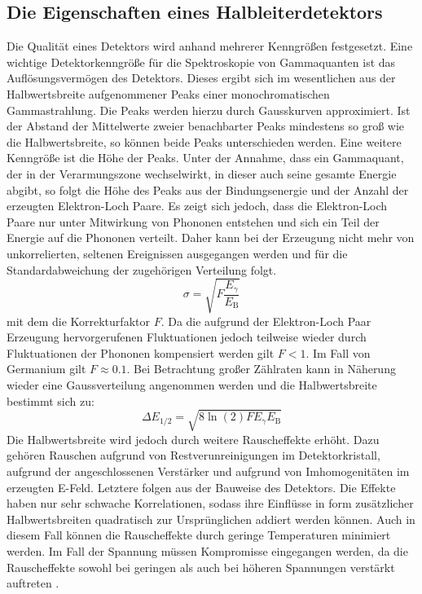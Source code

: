 \subsection{Die Eigenschaften eines Halbleiterdetektors}%
Die Qualität eines Detektors wird anhand mehrerer Kenngrößen festgesetzt.
Eine wichtige Detektorkenngröße für die Spektroskopie von Gammaquanten ist das Auflösungsvermögen des Detektors. Dieses ergibt sich im wesentlichen aus der Halbwertsbreite aufgenommener Peaks einer monochromatischen Gammastrahlung. Die Peaks werden hierzu durch Gausskurven approximiert. Ist der Abstand der Mittelwerte zweier benachbarter Peaks mindestens so groß wie die Halbwertsbreite, so können beide Peaks unterschieden werden. Eine weitere Kenngröße ist die Höhe der Peaks. Unter der Annahme, dass ein Gammaquant, der in der Verarmungszone wechselwirkt, in dieser auch seine gesamte Energie abgibt, so folgt die Höhe des Peaks aus der Bindungsenergie und der Anzahl der erzeugten Elektron-Loch Paare. Es zeigt sich jedoch, dass die Elektron-Loch Paare nur unter Mitwirkung von Phononen entstehen und sich ein Teil der Energie auf die Phononen verteilt. Daher kann bei der Erzeugung nicht mehr von unkorrelierten, seltenen Ereignissen ausgegangen werden und für die Standardabweichung der zugehörigen Verteilung folgt.
\begin{equation}
\sigma = \sqrt{F \frac{E_\gamma}{E_\text{B}} }
\end{equation}
mit dem die Korrekturfaktor $F$. Da die aufgrund der Elektron-Loch Paar Erzeugung hervorgerufenen Fluktuationen jedoch teilweise wieder durch Fluktuationen der Phononen kompensiert werden gilt $F < 1$. Im Fall von Germanium gilt $F \approx 0.1$. Bei Betrachtung großer Zählraten kann in Näherung wieder eine Gaussverteilung angenommen werden und die Halbwertsbreite bestimmt sich zu:
\begin{equation}
\Delta E_\text{1/2} = \sqrt{8 \ln(2) F E_\gamma E_\text{B}}
\end{equation}
Die Halbwertsbreite wird jedoch durch weitere Rauscheffekte erhöht. Dazu gehören Rauschen aufgrund von Restverunreinigungen im Detektorkristall, aufgrund der angeschlossenen Verstärker und aufgrund von Imhomogenitäten im erzeugten E-Feld. Letztere folgen aus der Bauweise des Detektors. Die Effekte haben nur sehr schwache Korrelationen, sodass ihre Einflüsse in form zusätzlicher Halbwertsbreiten quadratisch zur Ursprünglichen addiert werden können. Auch in diesem Fall können die Rauscheffekte durch geringe Temperaturen minimiert werden. Im Fall der Spannung müssen Kompromisse eingegangen werden, da die Rauscheffekte sowohl bei geringen als auch bei höheren Spannungen verstärkt auftreten .


